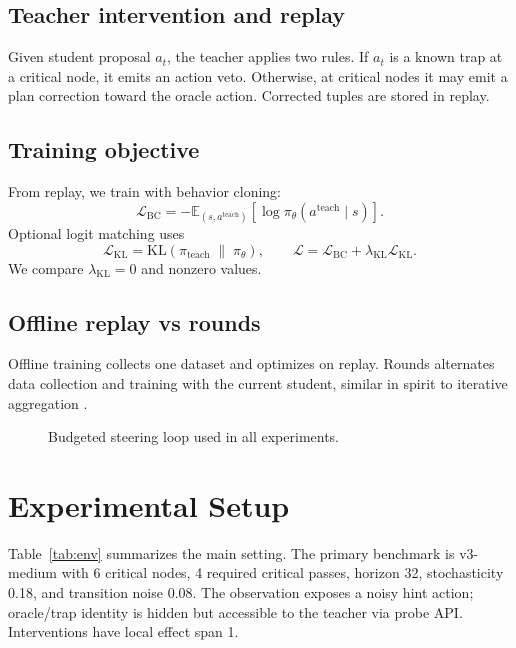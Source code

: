 \documentclass{article}
\begin{document}
\subsection{Teacher intervention and replay}
Given student proposal $a_t$, the teacher applies two rules. If $a_t$ is a known trap at a critical node, it emits an action veto. Otherwise, at critical nodes it may emit a plan correction toward the oracle action. Corrected tuples are stored in replay.

\subsection{Training objective}
From replay, we train with behavior cloning:
\begin{equation}
\mathcal{L}_{\text{BC}} = -\mathbb{E}_{(s,a^{\text{teach}})}\left[\log \pi_\theta(a^{\text{teach}}\mid s)\right].
\end{equation}
Optional logit matching uses
\begin{equation}
\mathcal{L}_{\text{KL}} = \mathrm{KL}(\pi_{\text{teach}}\;\|\;\pi_\theta), \qquad
\mathcal{L}=\mathcal{L}_{\text{BC}}+\lambda_{\text{KL}}\mathcal{L}_{\text{KL}}.
\end{equation}
We compare $\lambda_{\text{KL}}=0$ and nonzero values.

\subsection{Offline replay vs rounds}
Offline training collects one dataset and optimizes on replay. Rounds alternates data collection and training with the current student, similar in spirit to iterative aggregation \citep{ross2011dagger}.

\begin{figure}[t]
\centering
{}
\caption{Budgeted steering loop used in all experiments.}
\label{fig:overview}
\end{figure}

\section{Experimental Setup}
Table~\ref{tab:env} summarizes the main setting. The primary benchmark is v3-medium with 6 critical nodes, 4 required critical passes, horizon 32, stochasticity 0.18, and transition noise 0.08. The observation exposes a noisy hint action; oracle/trap identity is hidden but accessible to the teacher via probe API. Interventions have local effect span 1.
\end{document}
